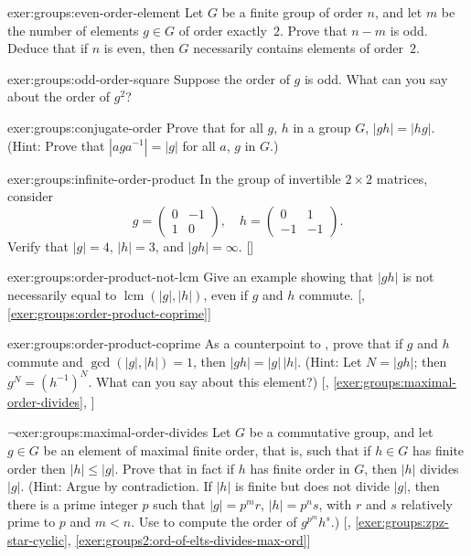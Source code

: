 \begin{exer}{}{exer:groups:even-order-element}
  Let $G$ be a finite group of order $n$, and let $m$ be the number of
  elements $g \in G$ of order exactly~$2$. Prove that $n - m$ is
  odd. Deduce that if $n$ is even, then $G$ necessarily contains
  elements of order~$2$.
\end{exer}
\begin{exer}{}{exer:groups:odd-order-square}
  Suppose the order of $g$ is odd. What can you say about the order of
  $g^2$?
\end{exer}

\begin{exer}{}{exer:groups:conjugate-order}
  Prove that for all $g$, $h$ in a group $G$, $|gh| = |hg|$. (Hint:
  Prove that $|aga^{-1}| = |g|$ for all $a$, $g$ in $G$.)
\end{exer}
\begin{exer}{\exerused}{exer:groups:infinite-order-product}
  In the group of invertible $2 \times 2$ matrices, consider
  \[
    g = \begin{pmatrix} 0 & -1 \\ 1 & 0 \end{pmatrix}, \quad h
    = \begin{pmatrix} 0 & 1 \\ -1 & -1 \end{pmatrix}.
  \]
  Verify that $|g| = 4$, $|h| = 3$, and $|gh| =
  \infty$. []
\end{exer}
\begin{exer}{\exerused}{exer:groups:order-product-not-lcm}
  Give an example showing that $|gh|$ is not necessarily equal to
  $\operatorname{lcm}(|g|,|h|)$, even if $g$ and $h$
  commute. [,
  \ref{exer:groups:order-product-coprime}]
\end{exer}
\begin{exer}{\exerused}{exer:groups:order-product-coprime}
  As a counterpoint to , prove
  that if $g$ and $h$ commute and $\gcd(|g|,|h|) = 1$, then
  $|gh| = |g|\,|h|$. (Hint: Let $N = |gh|$; then $g^N =
  (h^{-1})^N$. What can you say about this element?)
  [,
  \ref{exer:groups:maximal-order-divides},
  ]
\end{exer}
\begin{exer}{$\lnot$}{exer:groups:maximal-order-divides}
  Let $G$ be a commutative group, and let $g \in G$ be an element of
  maximal finite order, that is, such that if $h \in G$ has finite
  order then $|h| \leq |g|$. Prove that in fact if $h$ has finite
  order in $G$, then $|h|$ divides $|g|$. (Hint: Argue by
  contradiction. If $|h|$ is finite but does not divide $|g|$, then
  there is a prime integer $p$ such that $|g| = p^m r$, $|h| = p^n s$,
  with $r$ and $s$ relatively prime to $p$ and $m < n$. Use
   to compute the order of
  $g^{p^m} h^s$.) [,
  \ref{exer:groups:zpz-star-cyclic},
  \ref{exer:groups2:ord-of-elts-divides-max-ord}]
\end{exer}

